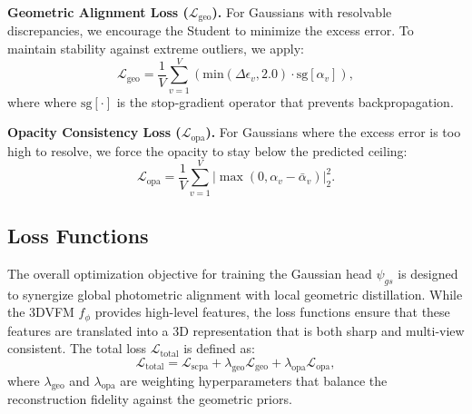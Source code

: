 \noindent \textbf{Geometric Alignment Loss ($\mathcal{L}_{\text{geo}}$).} 
For Gaussians with resolvable discrepancies, we encourage the Student to minimize the excess error. 
To maintain stability against extreme outliers, we apply:
\begin{equation}
    \mathcal{L}_{\text{geo}} = \frac{1}{V} \sum_{v=1}^V \left( \text{min}(\Delta \epsilon_v, 2.0) \cdot \text{sg}[\alpha_v] \right),
\end{equation}
where where $\text{sg}[\cdot]$ is the stop-gradient operator that prevents backpropagation.

\noindent \textbf{Opacity Consistency Loss ($\mathcal{L}_{\text{opa}}$).} 
For Gaussians where the excess error is too high to resolve, we force the opacity to stay below the predicted ceiling:
\begin{equation}
    \mathcal{L}_{\text{opa}} = \frac{1}{V} \sum_{v=1}^V | \max(0, \alpha_v - \bar{\alpha}_v) |_2^2.
\end{equation}



\subsection{Loss Functions}
The overall optimization objective for training the Gaussian head $\psi_{gs}$ is designed to synergize global photometric alignment with local geometric distillation. 
While the 3DVFM $f_{\phi}$ provides high-level features, the loss functions ensure that these features are translated into a 3D representation that is both sharp and multi-view consistent. 
The total loss $\mathcal{L}_{\text{total}}$ is defined as:
\begin{equation}
    \mathcal{L}_{\text{total}} = \mathcal{L}_{\text{scpa}} + \lambda_\text{geo} \mathcal{L}_{\text{geo}} + \lambda_\text{opa} \mathcal{L}_{\text{opa}},
\end{equation}
where $\lambda_\text{geo}$ and $\lambda_\text{opa}$ are weighting hyperparameters that balance the reconstruction fidelity against the geometric priors.



